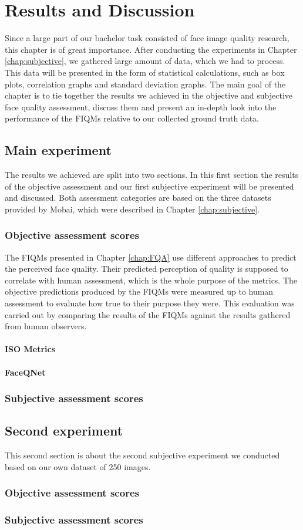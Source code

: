 \chapter{Results and Discussion}
\label{chap:Results}
Since a large part of our bachelor task consisted of face image quality research, this chapter is of great importance. After conducting the experiments in Chapter \ref{chap:subjective}, we gathered large amount of data, which we had to process. This data will be presented in the form of statistical calculations, such as box plots, correlation graphs and standard deviation graphs. The main goal of the chapter is to tie together the results we achieved in the objective and subjective face quality assessment, discuss them and present an in-depth look into the performance of the FIQMs relative to our collected ground truth data.   

\section{Main experiment}
The results we achieved are split into two sections. In this first section the results of the objective assessment and our first subjective experiment will be presented and discussed. Both assessment categories are based on the three datasets provided by Mobai, which were described in Chapter \ref{chap:subjective}. 

\subsection{Objective assessment scores}
The FIQMs presented in Chapter \ref{chap:FQA} use different approaches to predict the perceived face quality. Their predicted perception of quality is supposed to correlate with human assessment, which is the whole purpose of the metrics. The objective predictions produced by the FIQMs were measured up to human assessment to evaluate how true to their purpose they were. This evaluation was carried out by comparing the results of the FIQMs against the results gathered from human observers. 

\subsubsection{ISO Metrics}

\subsubsection{FaceQNet}

\subsection{Subjective assessment scores}

\section{Second experiment}
This second section is about the second subjective experiment we conducted based on our own dataset of 250 images. 
\subsection{Objective assessment scores}
\subsection{Subjective assessment scores}